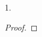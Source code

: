 \documentclass[11pt]{article}%
\begin{document}
\begin{noliste}{1.}
\begin{proof}


       

\end{proof}
\end{noliste}
\end{document}
